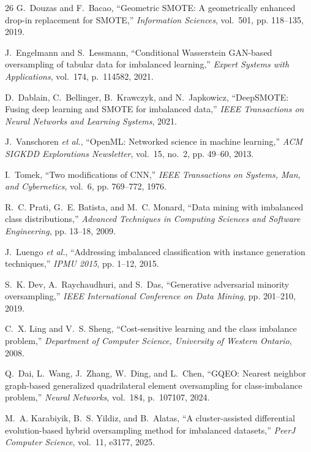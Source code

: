\documentclass[12pt,a4paper]{article}
\theoremstyle{definition}
\begin{document}
\begin{thebibliography}{26}
G.~Douzas and F.~Bacao,
``Geometric SMOTE: A geometrically enhanced drop-in replacement for SMOTE,''
\emph{Information Sciences}, vol.~501, pp. 118--135, 2019.

J.~Engelmann and S.~Lessmann,
``Conditional Wasserstein GAN-based oversampling of tabular data for imbalanced learning,''
\emph{Expert Systems with Applications}, vol.~174, p.~114582, 2021.

D.~Dablain, C.~Bellinger, B.~Krawczyk, and N.~Japkowicz,
``DeepSMOTE: Fusing deep learning and SMOTE for imbalanced data,''
\emph{IEEE Transactions on Neural Networks and Learning Systems}, 2021.

J.~Vanschoren \emph{et al.},
``OpenML: Networked science in machine learning,''
\emph{ACM SIGKDD Explorations Newsletter}, vol.~15, no.~2, pp. 49--60, 2013.

I.~Tomek,
``Two modifications of CNN,''
\emph{IEEE Transactions on Systems, Man, and Cybernetics}, vol.~6, pp. 769--772, 1976.

R.~C. Prati, G.~E. Batista, and M.~C. Monard,
``Data mining with imbalanced class distributions,''
\emph{Advanced Techniques in Computing Sciences and Software Engineering}, pp. 13--18, 2009.

J.~Luengo \emph{et al.},
``Addressing imbalanced classification with instance generation techniques,''
\emph{IPMU 2015}, pp. 1--12, 2015.

S.~K. Dev, A.~Raychaudhuri, and S.~Das,
``Generative adversarial minority oversampling,''
\emph{IEEE International Conference on Data Mining}, pp. 201--210, 2019.

C.~X. Ling and V.~S. Sheng,
``Cost-sensitive learning and the class imbalance problem,''
\emph{Department of Computer Science, University of Western Ontario}, 2008.

Q.~Dai, L.~Wang, J.~Zhang, W.~Ding, and L.~Chen,
``GQEO: Nearest neighbor graph-based generalized quadrilateral element oversampling for class-imbalance problem,''
\emph{Neural Networks}, vol.~184, p.~107107, 2024.

M.~A. Karabiyik, B.~S. Yildiz, and B.~Alatas,
``A cluster-assisted differential evolution-based hybrid oversampling method for imbalanced datasets,''
\emph{PeerJ Computer Science}, vol.~11, e3177, 2025.


\end{thebibliography}
\end{document}
